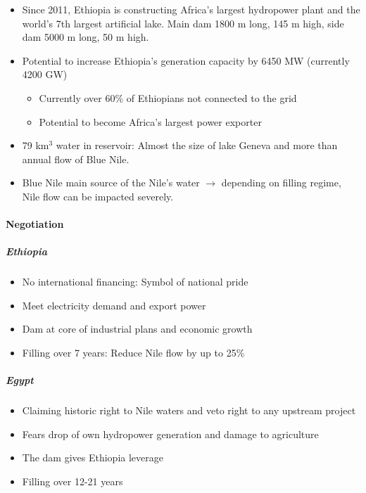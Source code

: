 \begin{itemize}
    \item Since 2011, Ethiopia is constructing Africa's largest hydropower
        plant and the world's 7th largest artificial lake. Main dam 1800 m
        long, 145 m high, side dam 5000 m long, 50 m high.
    \item Potential to increase Ethiopia's generation capacity by 6450 MW
        (currently 4200 GW)
        \begin{itemize}
            \item Currently over 60\% of Ethiopians not connected to the grid
            \item Potential to become Africa's largest power exporter
        \end{itemize}
    \item 79 km$^3$ water in reservoir: Almost the size of lake Geneva and
        more than annual flow of Blue Nile.
    \item Blue Nile main source of the Nile's water $\rightarrow$ depending
        on filling regime, Nile flow can be impacted severely.
\end{itemize}

\paragraph{Negotiation}

\subparagraph{Ethiopia}
\begin{itemize}
    \item No international financing: Symbol of national pride
    \item Meet electricity demand and export power
    \item Dam at core of industrial plans and economic growth
    \item Filling over 7 years: Reduce Nile flow by up to 25\%
\end{itemize}

\subparagraph{Egypt}
\begin{itemize}
    \item Claiming historic right to Nile waters and veto right to any upstream
        project
    \item Fears drop of own hydropower generation and damage to agriculture
    \item The dam gives Ethiopia leverage
    \item Filling over 12-21 years
\end{itemize}

